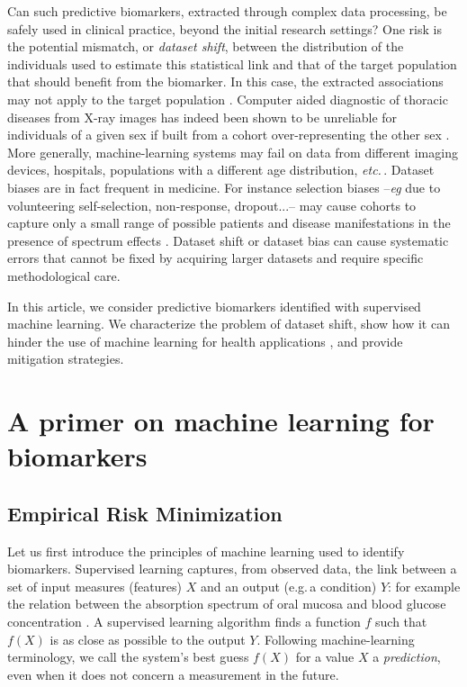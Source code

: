 \documentclass[a4paper,num-refs]{oup-contemporary}
\newcommand{\eg}{e.g.\,}
\newcommand{\etc}{\emph{etc.}\,}
\begin{document}
Can such predictive biomarkers, extracted through complex data processing, be safely
used in clinical practice, beyond the initial research settings? One risk
is the potential mismatch, or \emph{dataset shift}, between the distribution
of the individuals used to estimate this statistical link and that of the target
population that should benefit from the biomarker. In this case,
the extracted associations may not apply to the target
population \citep{kakarmath2020best}.
%
Computer aided diagnostic of thoracic diseases
from X-ray images has indeed been shown to be unreliable for individuals of a 
given sex if built from a cohort over-representing the other sex
\citep{larrazabal2020gender}.
%
More generally, machine-learning systems may fail on data from different
imaging devices, hospitals, populations with a different age distribution, \etc.
%
Dataset biases are in fact frequent in medicine. For instance selection
biases --\emph{eg} due to volunteering self-selection, non-response,
dropout...-- \citep{rothman2012epidemiology,tripepi2010selection}
may cause cohorts to capture only a small range of possible patients and
disease manifestations in the presence of 
spectrum effects \citep{ransohoff1978problems,mulherin2002spectrum}.
%
Dataset shift or dataset bias can
cause systematic errors that cannot be fixed by
acquiring larger datasets and require specific methodological care.


In this article, we consider predictive biomarkers identified with supervised machine learning.
We characterize the problem of dataset shift, show how it can hinder the use
of machine learning for health applications
\citep{woo2017building,wynants2020prediction}, and provide mitigation
strategies.
%

\section{A primer on machine learning for biomarkers}

\subsection{Empirical Risk Minimization}

Let us first introduce the principles of machine learning used to identify biomarkers.
%
Supervised learning captures, from observed data,
the link between a set of input
measures (features) $X$ and an output (\eg a condition) $Y$: for example the relation between the absorption spectrum of
oral mucosa and blood glucose concentration \citep{kasahara2018noninvasive}. A
supervised learning algorithm finds a function $f$ such that $f(X)$ is as close as possible to
the output $Y$.
%
Following machine-learning terminology, we call the system's best guess $f(X)$
for a value $X$ a \emph{prediction}, even when it does not concern a measurement
in the future.
\end{document}
